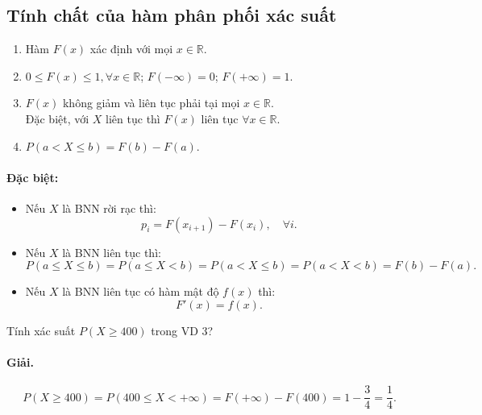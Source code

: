 \subsection{Tính chất của hàm phân phối xác suất}

\begin{enumerate}[label=\arabic*)]
    \item Hàm $F(x)$ xác định với mọi $x \in \mathbb{R}$.
    \item $0 \le F(x) \le 1, \forall x \in \mathbb{R}$; $F(-\infty) = 0$; $F(+\infty) = 1$.
    \item $F(x)$ không giảm và liên tục phải tại mọi $x \in \mathbb{R}$.\\
    Đặc biệt, với $X$ liên tục thì $F(x)$ liên tục $\forall x \in \mathbb{R}$.
    \item $P(a < X \le b) = F(b) - F(a)$.
\end{enumerate}

\paragraph{Đặc biệt:}
\begin{itemize}
    \item Nếu $X$ là BNN rời rạc thì:
    \[
    p_i = F(x_{i+1}) - F(x_i), \quad \forall i.
    \]
    \item Nếu $X$ là BNN liên tục thì:
    \[
    P(a \le X \le b) = P(a \le X < b) = P(a < X \le b) = P(a < X < b) = F(b) - F(a).
    \]
    \item Nếu $X$ là BNN liên tục có hàm mật độ $f(x)$ thì:
    \[
    F'(x) = f(x).
    \]
\end{itemize}

\begin{vidu}[VD 4]
Tính xác suất $P(X \ge 400)$ trong VD 3?

\paragraph{Giải.}
\[
P(X \ge 400) = P(400 \le X < +\infty) = F(+\infty) - F(400) = 1 - \frac{3}{4} = \frac{1}{4}.
\]
\end{vidu}

